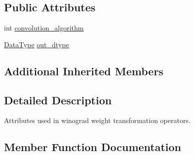 \subsection*{Public Attributes}
\begin{DoxyCompactItemize}
\item 
int \hyperlink{structtvm_1_1relay_1_1Conv2DWinogradNNPACKWeightTransformAttrs_a77b19e3aa880cd4476b261523aa6e9de}{convolution\+\_\+algorithm}
\item 
\hyperlink{namespacetvm_a41918af1a1dc386388639a9d3ad06c5d}{Data\+Type} \hyperlink{structtvm_1_1relay_1_1Conv2DWinogradNNPACKWeightTransformAttrs_a1c76da4597774015e5417f2f8592ad5c}{out\+\_\+dtype}
\end{DoxyCompactItemize}
\subsection*{Additional Inherited Members}


\subsection{Detailed Description}
Attributes used in winograd weight transformation operators. 

\subsection{Member Function Documentation}
